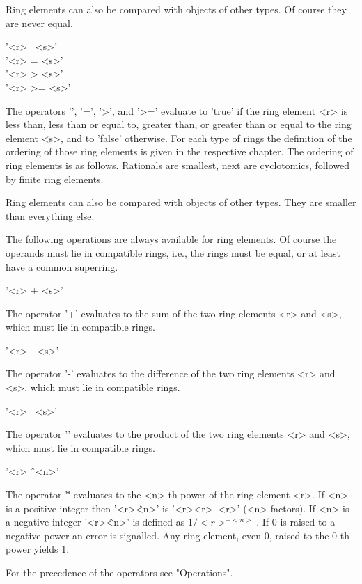 Ring  elements can  also be  compared with  objects of other  types.   Of
course they are never equal.

'<r> \<\ <s>' \\
'<r> \<= <s>' \\
'<r> >   <s>' \\
'<r> >=  <s>'

The operators '\<', '\<=', '>', and  '>=' evaluate  to 'true' if the ring
element <r> is less than, less than or equal to, greater than, or greater
than or equal  to the  ring  element <s>, and to  'false' otherwise.  For
each type of rings the definition of the ordering  of those ring elements
is given in the respective chapter.  The ordering  of ring elements is as
follows.  Rationals  are  smallest,  next are  cyclotomics,  followed  by
finite ring elements.

Ring elements can also be compared with objects of other types.  They are
smaller than everything else.


The following  operations   are always available  for ring  elements.  Of
course the operands must lie in compatible rings, i.e., the rings must be
equal, or at least have a common superring.

'<r> + <s>'

The operator '+' evaluates to  the sum of  the two ring elements <r> and
<s>, which must lie in compatible rings.

'<r> - <s>'

The operator  '-'  evaluates to the difference of  the two ring elements
<r> and <s>, which must lie in compatible rings.

'<r> \*\ <s>'

The operator '\*' evaluates to the product  of the two ring elements <r>
and <s>, which must lie in compatible rings.

'<r> \^\ <n>'

The operator '\^' evaluates to the <n>-th power of the ring element <r>.
If <n> is a  positive  integer  then  '<r>\^<n>'  is  '<r>\*<r>\*..\*<r>'
(<n> factors).  If <n> is a negative integer  '<r>\^<n>'  is  defined  as
$1 / {<r>^{-<n>}}$.   If 0 is  raised  to  a negative power   an error is
signalled.  Any ring element, even 0, raised to the 0-th power yields 1.

For the precedence of the operators see "Operations".

